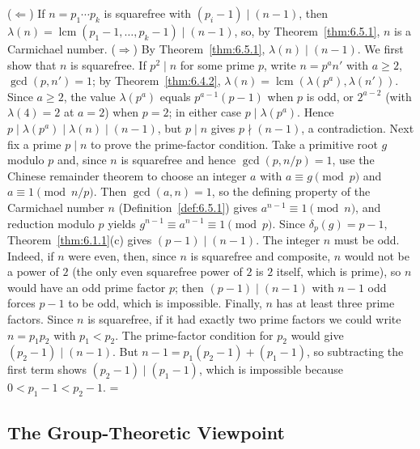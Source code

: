 \documentclass[11pt]{article}
\makeatletter
\theoremstyle{ntstyle}
\let\nt@closedisplay\]
\def\nt@guardedclose{\@ifnextchar\par{\nt@closeafterpar}{\@ifnextchar\end{\postdisplaypenalty\@M\nt@closedisplay}{\nt@closedisplay}}}
\def\nt@closeafterpar\par{\@ifnextchar\par{\nt@closeafterpar}{\@ifnextchar\end{\postdisplaypenalty\@M\nt@closedisplay\par}{\nt@closedisplay\par}}}
\renewenvironment{proof}[1][\proofname]{\par
  \pushQED{\qed}\normalfont\topsep\medskipamount\edef\nt@afterproof{\@endparpenalty=\the\@endparpenalty\relax}\@beginparpenalty\@M\@endparpenalty\@M\let\]\nt@guardedclose\trivlist\item[]\textit{#1\@addpunct{.}} \ignorespaces}{\ifvmode\addpenalty\@M\fi\popQED\nt@afterproof\endtrivlist\@endpefalse}
\DeclareMathOperator{\lcm}{lcm}
\makeatother
\begin{document}
\begin{proof} ($\Leftarrow$) If $n = p_1 \cdots p_k$ is
	squarefree with $(p_i-1) \mid (n-1)$, then $\lambda(n) =
		\lcm(p_1-1, \ldots, p_k-1) \mid (n-1)$, so, by Theorem~\ref{thm:6.5.1}, $n$ is a Carmichael
		number. ($\Rightarrow$) By Theorem~\ref{thm:6.5.1},
	$\lambda(n) \mid (n-1)$. We first show that $n$ is squarefree. If $p^{2} \mid n$ for
	some prime $p$, write $n = p^{a} n'$ with $a \ge 2$, $\gcd(p, n') =
		1$; by Theorem~\ref{thm:6.4.2}, $\lambda(n) =
		\lcm(\lambda(p^{a}), \lambda(n'))$. Since $a \ge 2$,
	the value $\lambda(p^{a})$ equals $p^{a-1}(p-1)$ when $p$ is odd, or $2^{a-2}$
	(with $\lambda(4)=2$ at $a=2$) when $p=2$; in either case $p \mid
		\lambda(p^{a})$. Hence $p \mid \lambda(p^{a}) \mid \lambda(n) \mid
		(n-1)$, but $p \mid n$ gives $p \nmid (n-1)$, a contradiction.
	Next fix a prime $p \mid n$ to prove the prime-factor condition. Take a primitive root $g$ modulo $p$ and, since $n$ is
	squarefree and hence $\gcd(p, n/p) = 1$, use the Chinese remainder
	theorem to choose an integer $a$ with $a \equiv g \pmod{p}$ and $a
		\equiv 1 \pmod{n/p}$. Then $\gcd(a, n) = 1$, so the defining property of the Carmichael number
		$n$ (Definition~\ref{def:6.5.1}) gives $a^{n-1} \equiv 1 \pmod{n}$, and reduction modulo $p$
		yields
	$g^{n-1} \equiv a^{n-1} \equiv 1 \pmod{p}$. Since $\delta_p(g) = p-1$,
	Theorem~\ref{thm:6.1.1}(c) gives $(p-1) \mid (n-1)$. The integer $n$ must be odd. Indeed, if $n$
	were even, then, since $n$ is squarefree
	and composite, $n$ would not be a power of $2$ (the only even squarefree
	power of $2$ is $2$ itself, which is prime), so $n$ would have an odd prime
	factor $p$; then $(p-1) \mid (n-1)$ with $n-1$ odd forces $p-1$
	to be odd, which is impossible. Finally, $n$ has at least three prime factors. Since $n$ is squarefree, if it had
	exactly two prime factors we could write $n=p_1p_2$ with $p_1<p_2$.
	The prime-factor condition for $p_2$ would give
	$(p_2-1)\mid(n-1)$. But
	$n-1=p_1(p_2-1)+(p_1-1)$, so subtracting the first term shows
	$(p_2-1)\mid(p_1-1)$, which is impossible because
	$0<p_1-1<p_2-1$.
\end{proof}
\subsection{The Group-Theoretic Viewpoint}\label{subsec:6.6}
\end{document}

